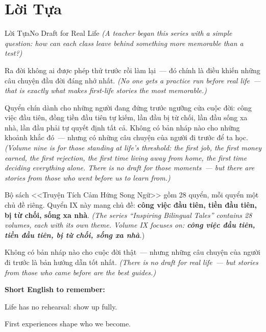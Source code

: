 \chapter*{Lời Tựa}

\begin{truyen}{Lời Tựa}{No Draft for Real Life}
\textit{(A teacher began this series with a simple question: how can each class leave behind something more memorable than a test?)}

Ra đời không ai được phép thử trước rồi làm lại~--- đó chính là điều khiến những câu chuyện đầu đời đáng nhớ nhất.
\textit{(No one gets a practice run before real life~--- that is exactly what makes first-life stories the most memorable.)}

Quyển chín dành cho những người đang đứng trước ngưỡng cửa cuộc đời: công việc đầu tiên, đồng tiền đầu tiên tự kiếm, lần đầu bị từ chối, lần đầu sống xa nhà, lần đầu phải tự quyết định tất cả. Không có bản nháp nào cho những khoảnh khắc đó~--- nhưng có những câu chuyện của người đi trước để ta học.
\textit{(Volume nine is for those standing at life's threshold: the first job, the first money earned, the first rejection, the first time living away from home, the first time deciding everything alone. There is no draft for those moments~--- but there are stories from those who went before us to learn from.)}

Bộ sách <<Truyện Tích Cảm Hứng Song Ngữ>> gồm 28 quyển, mỗi quyển một chủ đề riêng. Quyển IX này mang chủ đề: \textbf{công việc đầu tiên, tiền đầu tiên, bị từ chối, sống xa nhà}.
\textit{(The series ``Inspiring Bilingual Tales'' contains 28 volumes, each with its own theme. Volume IX focuses on: \textbf{công việc đầu tiên, tiền đầu tiên, bị từ chối, sống xa nhà}.})
\end{truyen}

\begin{baihoc}
Không có bản nháp nào cho cuộc đời thật~--- nhưng những câu chuyện của người đi trước là bản hướng dẫn tốt nhất.
\textit{(There is no draft for real life~--- but stories from those who came before are the best guides.)}
\end{baihoc}

\begin{ghinhoanh}
\textbf{Short English to remember:}

Life has no rehearsal: show up fully.

First experiences shape who we become.
\end{ghinhoanh}

